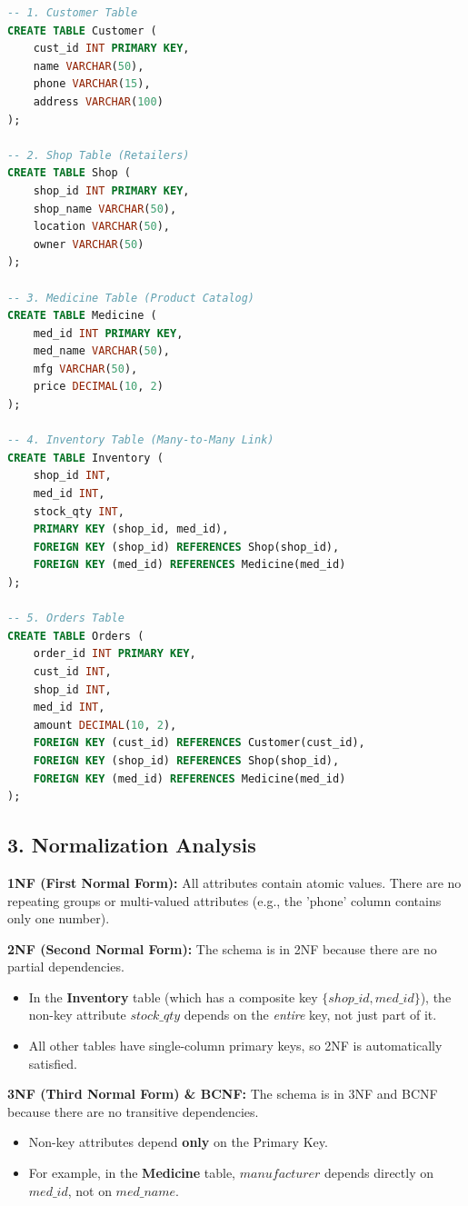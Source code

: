 \documentclass{article}
\begin{document}
\begin{lstlisting}[language=SQL, caption=Database Creation Scripts]
-- 1. Customer Table
CREATE TABLE Customer (
    cust_id INT PRIMARY KEY,
    name VARCHAR(50),
    phone VARCHAR(15),
    address VARCHAR(100)
);

-- 2. Shop Table (Retailers)
CREATE TABLE Shop (
    shop_id INT PRIMARY KEY,
    shop_name VARCHAR(50),
    location VARCHAR(50),
    owner VARCHAR(50)
);

-- 3. Medicine Table (Product Catalog)
CREATE TABLE Medicine (
    med_id INT PRIMARY KEY,
    med_name VARCHAR(50),
    mfg VARCHAR(50),
    price DECIMAL(10, 2)
);

-- 4. Inventory Table (Many-to-Many Link)
CREATE TABLE Inventory (
    shop_id INT,
    med_id INT,
    stock_qty INT,
    PRIMARY KEY (shop_id, med_id),
    FOREIGN KEY (shop_id) REFERENCES Shop(shop_id),
    FOREIGN KEY (med_id) REFERENCES Medicine(med_id)
);

-- 5. Orders Table
CREATE TABLE Orders (
    order_id INT PRIMARY KEY,
    cust_id INT,
    shop_id INT,
    med_id INT,
    amount DECIMAL(10, 2),
    FOREIGN KEY (cust_id) REFERENCES Customer(cust_id),
    FOREIGN KEY (shop_id) REFERENCES Shop(shop_id),
    FOREIGN KEY (med_id) REFERENCES Medicine(med_id)
);
\end{lstlisting}

\subsection{3. Normalization Analysis}

\textbf{1NF (First Normal Form):}
All attributes contain atomic values. There are no repeating groups or multi-valued attributes (e.g., the 'phone' column contains only one number).

\textbf{2NF (Second Normal Form):}
The schema is in 2NF because there are no partial dependencies. 
\begin{itemize}
    \item In the \textbf{Inventory} table (which has a composite key $\{shop\_id, med\_id\}$), the non-key attribute $stock\_qty$ depends on the \textit{entire} key, not just part of it.
    \item All other tables have single-column primary keys, so 2NF is automatically satisfied.
\end{itemize}

\textbf{3NF (Third Normal Form) \& BCNF:}
The schema is in 3NF and BCNF because there are no transitive dependencies. 
\begin{itemize}
    \item Non-key attributes depend \textbf{only} on the Primary Key. 
    \item For example, in the \textbf{Medicine} table, $manufacturer$ depends directly on $med\_id$, not on $med\_name$.
\end{itemize}
\end{document}
